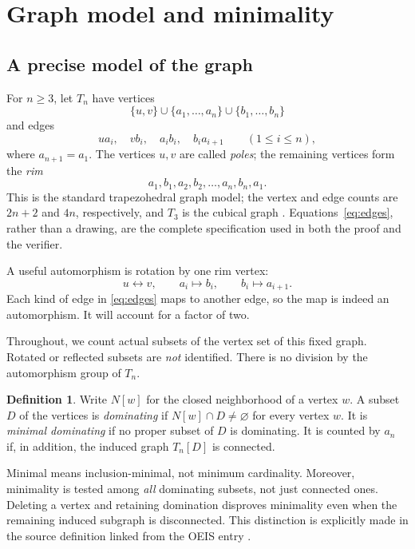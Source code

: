 \documentclass[11pt,letterpaper]{article}
\numberwithin{equation}{section}
\theoremstyle{definition}
\newtheorem{definition}[theorem]{Definition}
\theoremstyle{remark}
\begin{document}
\section{Graph model and minimality}

\subsection{A precise model of the graph}
For $n\ge3$, let $T_n$ have vertices
\[
 \{u,v\}\cup\{a_1,\ldots,a_n\}\cup\{b_1,\ldots,b_n\}
\]
and edges
\begin{equation}\label{eq:edges}
 ua_i,\quad vb_i,\quad a_ib_i,\quad b_ia_{i+1}
 \qquad(1\le i\le n),
\end{equation}
where $a_{n+1}=a_1$. The vertices $u,v$ are called \emph{poles}; the
remaining vertices form the \emph{rim}
\[
 a_1,b_1,a_2,b_2,\ldots,a_n,b_n,a_1.
\]
This is the standard trapezohedral graph model; the vertex and edge
counts are $2n+2$ and $4n$, respectively, and $T_3$ is the cubical graph
\cite{trapezohedral}. Equations~\eqref{eq:edges}, rather than a drawing,
are the complete specification used in both the proof and the verifier.

A useful automorphism is rotation by one rim vertex:
\begin{equation}\label{eq:swap}
 u\longleftrightarrow v,\qquad
 a_i\longmapsto b_i,\qquad b_i\longmapsto a_{i+1}.
\end{equation}
Each kind of edge in \eqref{eq:edges} maps to another edge, so the map
is indeed an automorphism. It will account for a factor of two.

Throughout, we count actual subsets of the vertex set of this fixed
graph. Rotated or reflected subsets are \emph{not} identified. There
is no division by the automorphism group of $T_n$.

\begin{definition}
Write $N[w]$ for the closed neighborhood of a vertex $w$. A subset
$D$ of the vertices is \emph{dominating} if $N[w]\cap D\ne\varnothing$
for every vertex $w$. It is \emph{minimal dominating} if no proper
subset of $D$ is dominating. It is counted by $a_n$ if, in addition,
the induced graph $T_n[D]$ is connected.
\end{definition}

Minimal means inclusion-minimal, not minimum cardinality. Moreover,
minimality is tested among \emph{all} dominating subsets, not just
connected ones. Deleting a vertex and retaining domination disproves
minimality even when the remaining induced subgraph is disconnected.
This distinction is explicitly made in the source definition linked
from the OEIS entry \cite{minimaldominating}.
\end{document}
